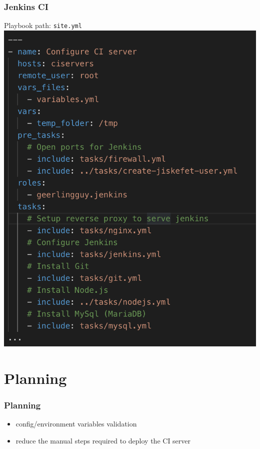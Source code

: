 \documentclass[12pt]{beamer}
\begin{document}
    \begin{frame}
        \frametitle{Jenkins CI}
        Playbook
        \newline
        path: \texttt{site.yml}
        \newline
   		\includegraphics[scale=.35]{assets/deploy_ci.png}
    \end{frame}

	\section{Planning}
	\begin{frame}
		\frametitle{Planning}
		\begin{itemize}
            \item config/environment variables validation
            \item reduce the manual steps required to deploy the CI server
		\end{itemize}
    \end{frame}
\end{document}
